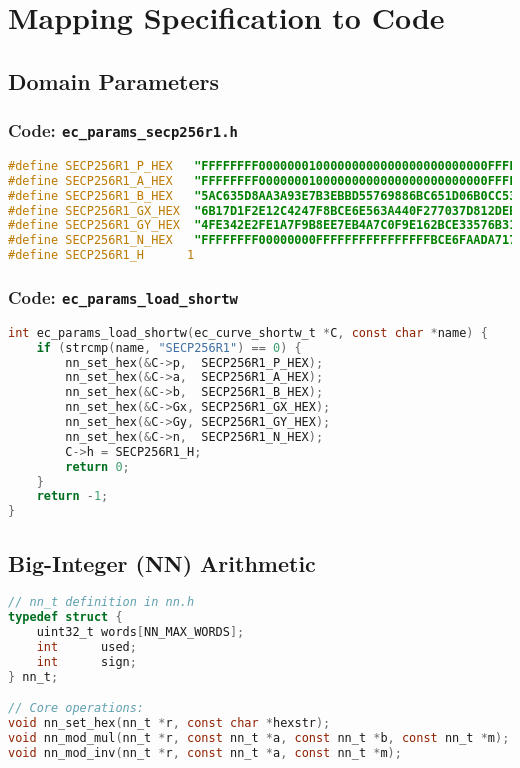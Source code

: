 \documentclass[12pt,a4paper]{article}
\begin{document}
\section{Mapping Specification to Code}

\subsection{Domain Parameters}
\subsubsection{Code: \texttt{ec\_params\_secp256r1.h}}
\begin{lstlisting}[language=C]
#define SECP256R1_P_HEX   "FFFFFFFF00000001000000000000000000000000FFFFFFFFFFFFFFFFFFFFFFFF"
#define SECP256R1_A_HEX   "FFFFFFFF00000001000000000000000000000000FFFFFFFFFFFFFFFFFFFFFFFC"
#define SECP256R1_B_HEX   "5AC635D8AA3A93E7B3EBBD55769886BC651D06B0CC53B0F63BCE3C3E27D2604B"
#define SECP256R1_GX_HEX  "6B17D1F2E12C4247F8BCE6E563A440F277037D812DEB33A0F4A13945D898C296"
#define SECP256R1_GY_HEX  "4FE342E2FE1A7F9B8EE7EB4A7C0F9E162BCE33576B315ECECBB6406837BF51F5"
#define SECP256R1_N_HEX   "FFFFFFFF00000000FFFFFFFFFFFFFFFFBCE6FAADA7179E84F3B9CAC2FC632551"
#define SECP256R1_H      1
\end{lstlisting}

\subsubsection{Code: \texttt{ec\_params\_load\_shortw}}
\begin{lstlisting}[language=C]
int ec_params_load_shortw(ec_curve_shortw_t *C, const char *name) {
	if (strcmp(name, "SECP256R1") == 0) {
		nn_set_hex(&C->p,  SECP256R1_P_HEX);
		nn_set_hex(&C->a,  SECP256R1_A_HEX);
		nn_set_hex(&C->b,  SECP256R1_B_HEX);
		nn_set_hex(&C->Gx, SECP256R1_GX_HEX);
		nn_set_hex(&C->Gy, SECP256R1_GY_HEX);
		nn_set_hex(&C->n,  SECP256R1_N_HEX);
		C->h = SECP256R1_H;
		return 0;
	}
	return -1;
}
\end{lstlisting}

\subsection{Big-Integer (NN) Arithmetic}
\begin{lstlisting}[language=C]
// nn_t definition in nn.h
typedef struct {
	uint32_t words[NN_MAX_WORDS];
	int      used;
	int      sign;
} nn_t;

// Core operations:
void nn_set_hex(nn_t *r, const char *hexstr);
void nn_mod_mul(nn_t *r, const nn_t *a, const nn_t *b, const nn_t *m);
void nn_mod_inv(nn_t *r, const nn_t *a, const nn_t *m);
\end{lstlisting}
\end{document}

